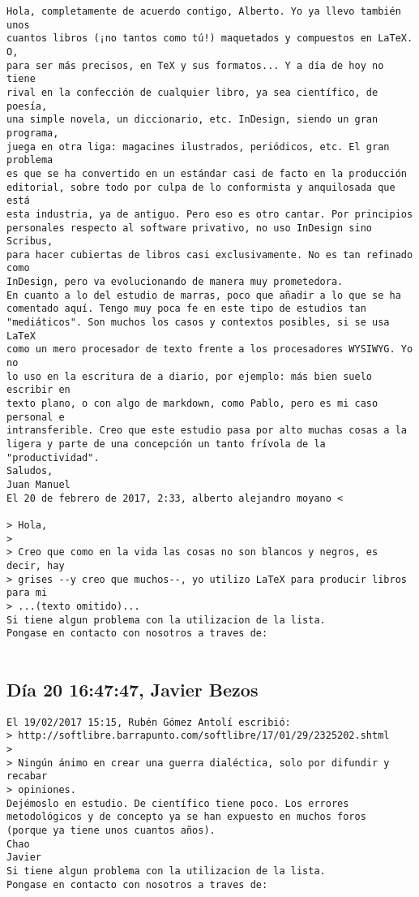\documentclass[a4paper,10pt]{article}
\begin{document}
\begin{lstlisting}
Hola, completamente de acuerdo contigo, Alberto. Yo ya llevo también unos
cuantos libros (¡no tantos como tú!) maquetados y compuestos en LaTeX. O,
para ser más precisos, en TeX y sus formatos... Y a día de hoy no tiene
rival en la confección de cualquier libro, ya sea científico, de poesía,
una simple novela, un diccionario, etc. InDesign, siendo un gran programa,
juega en otra liga: magacines ilustrados, periódicos, etc. El gran problema
es que se ha convertido en un estándar casi de facto en la producción
editorial, sobre todo por culpa de lo conformista y anquilosada que está
esta industria, ya de antiguo. Pero eso es otro cantar. Por principios
personales respecto al software privativo, no uso InDesign sino Scribus,
para hacer cubiertas de libros casi exclusivamente. No es tan refinado como
InDesign, pero va evolucionando de manera muy prometedora.
En cuanto a lo del estudio de marras, poco que añadir a lo que se ha
comentado aquí. Tengo muy poca fe en este tipo de estudios tan
"mediáticos". Son muchos los casos y contextos posibles, si se usa LaTeX
como un mero procesador de texto frente a los procesadores WYSIWYG. Yo no
lo uso en la escritura de a diario, por ejemplo: más bien suelo escribir en
texto plano, o con algo de markdown, como Pablo, pero es mi caso personal e
intransferible. Creo que este estudio pasa por alto muchas cosas a la
ligera y parte de una concepción un tanto frívola de la "productividad".
Saludos,
Juan Manuel
El 20 de febrero de 2017, 2:33, alberto alejandro moyano <

> Hola,
>
> Creo que como en la vida las cosas no son blancos y negros, es decir, hay
> grises --y creo que muchos--, yo utilizo LaTeX para producir libros para mi
> ...(texto omitido)...
Si tiene algun problema con la utilizacion de la lista.
Pongase en contacto con nosotros a traves de:


\end{lstlisting}

\subsection{Día 20 16:47:47, Javier Bezos}

\begin{lstlisting}
El 19/02/2017 15:15, Rubén Gómez Antolí escribió:
> http://softlibre.barrapunto.com/softlibre/17/01/29/2325202.shtml
>
> Ningún ánimo en crear una guerra dialéctica, solo por difundir y recabar
> opiniones.
Dejémoslo en estudio. De científico tiene poco. Los errores
metodológicos y de concepto ya se han expuesto en muchos foros
(porque ya tiene unos cuantos años).
Chao
Javier
Si tiene algun problema con la utilizacion de la lista.
Pongase en contacto con nosotros a traves de:


\end{lstlisting}
\end{document}
